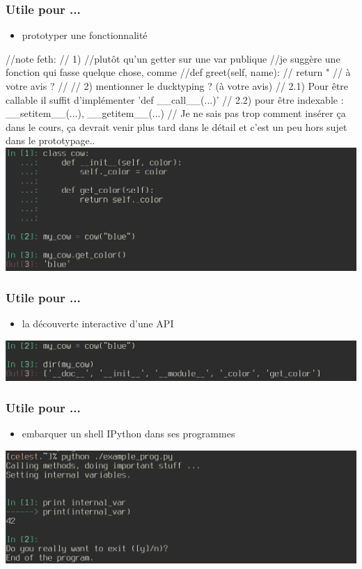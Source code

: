 \begin{frame}
  \frametitle{Utile pour ...}
    \begin{itemize}
      \item prototyper une fonctionnalité
    \end{itemize}
    //note feth:
    // 1)
    //plutôt qu'un getter sur une var publique
    //je suggère une fonction qui fasse quelque chose, comme
    //def greet(self, name):
    //    return "%
    // à votre avis ?
    //
    // 2) mentionner le ducktyping ? (à votre avis)
    // 2.1) Pour être callable il suffit d'implémenter 'def \_\_call\_\_(...)'
    // 2.2) pour être indexable : \_\_setitem\_\_(...), \_\_getitem\_\_(...)
    // Je ne sais pas trop comment insérer ça dans le cours, ça devrait venir plus tard dans le détail et c'est un peu hors sujet dans le prototypage..
  \includegraphics[scale=0.35]{prototype.png}
\end{frame}

\begin{frame}
  \frametitle{Utile pour ...}
    \begin{itemize}
      \item la découverte interactive d'une API
    \end{itemize}
  \includegraphics[scale=0.35]{api_discover.png}
\end{frame}

\begin{frame}
  \frametitle{Utile pour ...}
    \begin{itemize}
      \item embarquer un shell IPython dans ses programmes
    \end{itemize}
  \includegraphics[scale=0.35]{embedded_ipython.png}
\end{frame}

